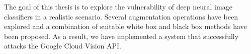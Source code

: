 \documentclass[12pt]{report}
\begin{document}
The goal of this thesis is to explore the vulnerability of deep neural image classifiers in a realistic scenario. Several augmentation operations have been explored and a combination of suitable white box and black box methods have been proposed. As a result, we have implemented a system that successfully attacks the Google Cloud Vision API. 


\end{document}
